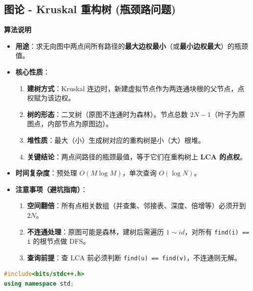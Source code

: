 \documentclass[10pt,landscape,a4paper]{article}
\begin{document}
\begin{multicols*}{3}
\subsection*{图论 - Kruskal 重构树 (瓶颈路问题)}
\par\addvspace{0.7ex}\noindent\textbf{算法说明}\par\nobreak
\begin{itemize}
\item \textbf{用途}：求无向图中两点间所有路径的\textbf{最大边权最小}（或\textbf{最小边权最大}）的瓶颈值。
\item \textbf{核心性质}：
\begin{enumerate}[start=1]
\item \textbf{建树方式}：Kruskal 连边时，新建虚拟节点作为两连通块根的父节点，点权赋为该边权。
\item \textbf{树的形态}：二叉树（原图不连通时为森林）。节点总数 $2N-1$（叶子为原图点，内部节点为原图边）。
\item \textbf{堆性质}：最大（小）生成树对应的重构树是小（大）根堆。
\item \textbf{关键结论}：两点间路径的瓶颈最值，等于它们在重构树上 \textbf{LCA 的点权}。
\end{enumerate}
\item \textbf{时间复杂度}：预处理 $O(M \log M)$，单次查询 $O(\log N)$。
\item \textbf{注意事项（避坑指南）}：
\begin{enumerate}[start=1]
\item \textbf{空间翻倍}：所有点相关数组（并查集、邻接表、深度、倍增等）必须开到 \textbf{$2N$}。
\item \textbf{不连通处理}：原图可能是森林，建树后需遍历 $1 \sim id$，对所有 \texttt{f\allowbreak{}i\allowbreak{}n\allowbreak{}d\allowbreak{}(\allowbreak{}i\allowbreak{})\allowbreak{} \allowbreak{}=\allowbreak{}=\allowbreak{} \allowbreak{}i} 的根节点做 DFS。
\item \textbf{查询前提}：查 LCA 前必须判断 \texttt{f\allowbreak{}i\allowbreak{}n\allowbreak{}d\allowbreak{}(\allowbreak{}u\allowbreak{})\allowbreak{} \allowbreak{}=\allowbreak{}=\allowbreak{} \allowbreak{}f\allowbreak{}i\allowbreak{}n\allowbreak{}d\allowbreak{}(\allowbreak{}v\allowbreak{})}，不连通则无解。
\end{enumerate}
\end{itemize}
\par{}\par
\begin{lstlisting}[language=C++]
#include<bits/stdc++.h>
using namespace std;


\end{lstlisting}
\end{multicols*}
\end{document}
